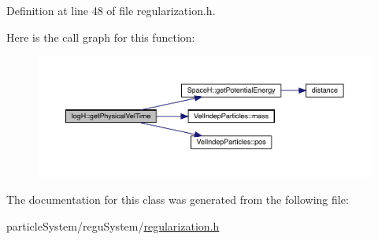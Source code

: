 Definition at line 48 of file regularization.\+h.

Here is the call graph for this function\+:\nopagebreak
\begin{figure}[H]
\begin{center}
\leavevmode
\includegraphics[width=350pt]{classlog_h_a36f5b226fde188b50bf9df1451c75199_cgraph}
\end{center}
\end{figure}


The documentation for this class was generated from the following file\+:\begin{DoxyCompactItemize}
\item 
particle\+System/regu\+System/\mbox{\hyperlink{regularization_8h}{regularization.\+h}}\end{DoxyCompactItemize}
